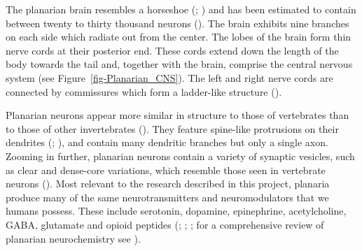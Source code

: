 \documentclass[
  jou,
  floatsintext,
  longtable,
  nolmodern,
  notxfonts,
  notimes,
  donotrepeattitle,
  colorlinks=true,linkcolor=blue,citecolor=blue,urlcolor=blue]{apa7}
\begin{document}
The planarian brain resembles a horseshoe
(;
) and has been
estimated to contain between twenty to thirty thousand neurons
(). The brain
exhibits nine branches on each side which radiate out from the center.
The lobes of the brain form thin nerve cords at their posterior end.
These cords extend down the length of the body towards the tail and,
together with the brain, comprise the central nervous system (see
Figure~\ref{fig-Planarian_CNS}). The left and right nerve cords are
connected by commissures which form a ladder-like structure
().

Planarian neurons appear more similar in structure to those of
vertebrates than to those of other invertebrates
(). They feature
spine-like protrusions on their dendrites
(;
), and contain
many dendritic branches but only a single axon. Zooming in further,
planarian neurons contain a variety of synaptic vesicles, such as clear
and dense-core variations, which resemble those seen in vertebrate
neurons (). Most relevant to the research described in this project,
planaria produce many of the same neurotransmitters and neuromodulators
that we humans possess. These include serotonin, dopamine, epinephrine,
acetylcholine, GABA, glutamate and opioid peptides
(;
;
;
for a comprehensive review of planarian neurochemistry see
).
\end{document}
